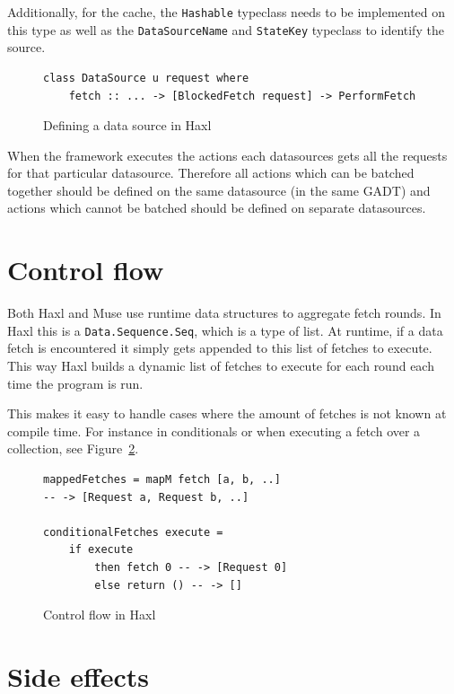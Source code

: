 Additionally, for the cache, the \texttt{Hashable} typeclass needs to be implemented on this type as well as the \texttt{DataSourceName} and \texttt{StateKey} typeclass to identify the source.

\begin{figure}
\begin{verbatim}
class DataSource u request where
    fetch :: ... -> [BlockedFetch request] -> PerformFetch
\end{verbatim}
\caption{Defining a data source in Haxl}
\label{fig:defining-datsource-in-haxl}
\end{figure}

When the framework executes the actions each datasources gets all the requests for that particular datasource. Therefore all actions which can be batched together should be defined on the same datasource (in the same GADT) and actions which cannot be batched should be defined on separate datasources.

\section{Control flow}

Both Haxl and Muse use runtime data structures to aggregate fetch rounds.
In Haxl this is a \texttt{Data.Sequence.Seq}, which is a type of list.
At runtime, if a data fetch is encountered it simply gets appended to this list of fetches to execute.
This way Haxl builds a dynamic list of fetches to execute for each round each time the program is run.

This makes it easy to handle cases where the amount of fetches is not known at compile time.
For instance in conditionals or when executing a fetch over a collection, see Figure~\ref{fig:control-flow-in-haxl}.

\begin{figure}
\begin{verbatim}
mappedFetches = mapM fetch [a, b, ..]
-- -> [Request a, Request b, ..]

conditionalFetches execute =
    if execute
        then fetch 0 -- -> [Request 0]
        else return () -- -> []
\end{verbatim}
\caption{Control flow in Haxl}
\label{fig:control-flow-in-haxl}
\end{figure}

\section{Side effects}

